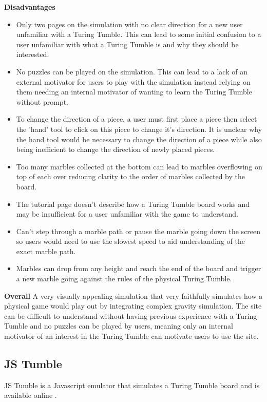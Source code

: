 \documentclass{l4proj}
\begin{document}
\textbf{Disadvantages}
\begin{itemize}
    \item Only two pages on the simulation with no clear direction for a new user unfamiliar with a Turing Tumble. This can lead to some initial confusion to a user unfamiliar with what a Turing Tumble is and why they should be interested.
    \item No puzzles can be played on the simulation. This can lead to a lack of an external motivator for users to play with the simulation instead relying on them needing an internal motivator of wanting to learn the Turing Tumble without prompt.
    \item To change the direction of a piece, a user must first place a piece then select the 'hand' tool to click on this piece to change it's direction. It is unclear why the hand tool would be necessary to change the direction of a piece while also being inefficient to change the direction of newly placed pieces.
    \item Too many marbles collected at the bottom can lead to marbles overflowing on top of each over reducing clarity to the order of marbles collected by the board.
    \item The tutorial page doesn't describe how a Turing Tumble board works and may be insufficient for a user unfamiliar with the game to understand.
    \item Can't step through a marble path or pause the marble going down the screen so users would need to use the slowest speed to aid understanding of the exact marble path.
    \item Marbles can drop from any height and reach the end of the board and trigger a new marble going against the rules of the physical Turing Tumble.
\end{itemize}

\textbf{Overall}
A very visually appealing simulation that very faithfully simulates how a physical game would play out by integrating complex gravity simulation. The site can be difficult to understand without having previous experience with a Turing Tumble and no puzzles can be played by users, meaning only an internal motivator of an interest in the Turing Tumble can motivate users to use the site.

\subsection{JS Tumble}
JS Tumble is a Javascript emulator that simulates a Turing Tumble board and is available online \cite{jstumble}.
\end{document}
